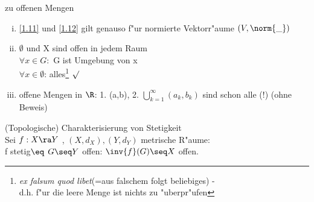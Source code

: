 \begin{bem}\label{1.13}{zu offenen Mengen}
\begin{enumerate}[(i)]
\item \ref{1.11} und \ref{1.12} gilt genauso f"ur normierte Vektorr"aume $(V,\norm{\_ })$
\item $\emptyset$ und X sind offen in jedem Raum\\
$\forall x\in G:$ G ist Umgebung von x\\
$\forall x\in\emptyset $: alles\footnote{{\it ex falsum quod libet}(=aus falschem folgt beliebiges) - \\ \hspace*{0.6cm}d.h. f"ur die leere Menge ist nichts zu "uberpr"ufen} $\surd$
\item offene Mengen in $\R$: 1. (a,b), 2. $\bigcup_{k=1}^\infty (a_k,b_k)$ sind schon alle (!) (ohne Beweis)
\end{enumerate}
\end{bem}
\begin{prop}\label{1.14}{(Topologische) Charakterisierung von Stetigkeit}\\
Sei $f:X\ra Y$ , $(X,d_X),(Y,d_Y)$ metrische R"aume:\\
f stetig$\eq$ $G\seq Y$ offen: $\inv{f}(G)\seq X$ offen.\\
\hspace*{5cm}
\end{prop}

